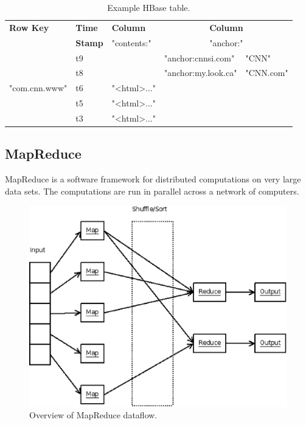 \begin{table}[h]
    \begin{center}
        \begin{tabular}{|l|l|l|l|l|}
        \hline
        \small \bf Row Key & \small \bf Time & \small \bf Column &
        \multicolumn{2}{|c|}{\small \bf Column} \\
         & \small \bf Stamp & \small "contents:" &
        \multicolumn{2}{|c|}{\small "anchor:"} \\
        \hline
         & t9 & & \small "anchor:cnnsi.com" & "CNN" \\
         & t8 & & \small "anchor:my.look.ca" & "CNN.com" \\
        "com.cnn.www" & t6 & \small "{\textless}html\textgreater..." & & \\
         & t5 & \small "{\textless}html\textgreater..." & & \\
         & t3 & \small "{\textless}html\textgreater..." & & \\
        \hline
        \end{tabular}
        \caption{Example HBase table.}
    \end{center}
\end{table}


\subsection{MapReduce}

MapReduce is a software framework for distributed computations on very large
data sets. The computations are run in parallel across a network of computers.

\vspace{12pt}

\begin{figure}[h]
    \begin{center}
        \includegraphics[scale=0.50]{gfx/map-reduce.eps}
        \caption{Overview of MapReduce dataflow.}
    \end{center}
\end{figure}

